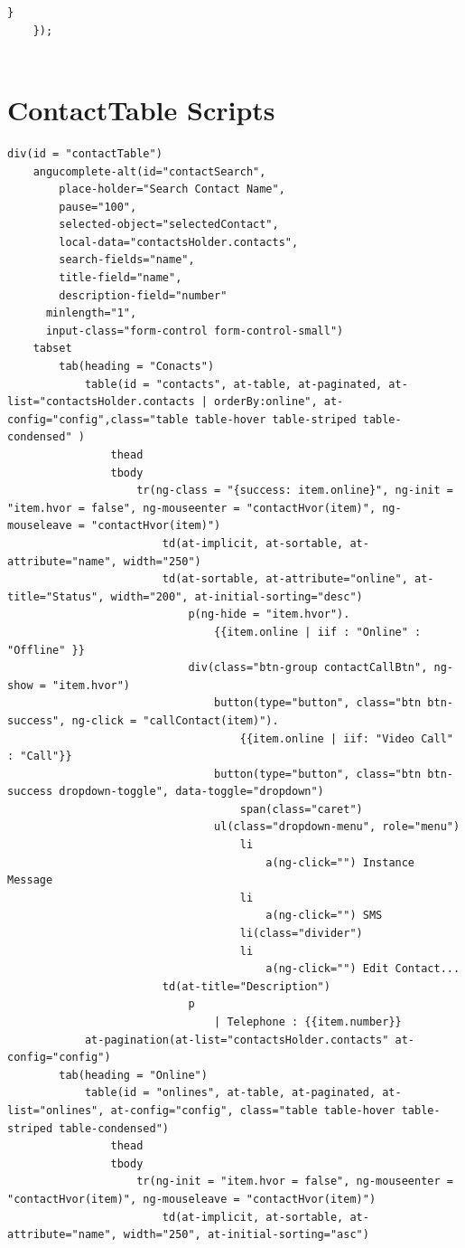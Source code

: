 \begin{appendices}
\begin{lstlisting}[caption={WebRTCService.js in application client},label={code:webrtc_service}]
		}
	});	
	
\end{lstlisting}

\section{ContactTable Scripts} 
\label{app:contact_table}

\begin{lstlisting}[caption={contactTable.jade in application client},label={code:contact_table}]
div(id = "contactTable")
	angucomplete-alt(id="contactSearch",
		place-holder="Search Contact Name",
		pause="100",
		selected-object="selectedContact",
		local-data="contactsHolder.contacts",
		search-fields="name",
		title-field="name",
		description-field="number"
	  minlength="1",
	  input-class="form-control form-control-small")
	tabset
		tab(heading = "Conacts")
			table(id = "contacts", at-table, at-paginated, at-list="contactsHolder.contacts | orderBy:online", at-config="config",class="table table-hover table-striped table-condensed" )
				thead
				tbody
					tr(ng-class = "{success: item.online}", ng-init = "item.hvor = false", ng-mouseenter = "contactHvor(item)", ng-mouseleave = "contactHvor(item)")
						td(at-implicit, at-sortable, at-attribute="name", width="250")
						td(at-sortable, at-attribute="online", at-title="Status", width="200", at-initial-sorting="desc")
							p(ng-hide = "item.hvor").
								{{item.online | iif : "Online" : "Offline" }}
							div(class="btn-group contactCallBtn", ng-show = "item.hvor")
								button(type="button", class="btn btn-success", ng-click = "callContact(item)").
									{{item.online | iif: "Video Call" : "Call"}}
								button(type="button", class="btn btn-success dropdown-toggle", data-toggle="dropdown")
									span(class="caret")
								ul(class="dropdown-menu", role="menu")
									li
										a(ng-click="") Instance Message
									li
										a(ng-click="") SMS
									li(class="divider")
									li
										a(ng-click="") Edit Contact...
						td(at-title="Description")
							p
								| Telephone : {{item.number}}
			at-pagination(at-list="contactsHolder.contacts" at-config="config")
		tab(heading = "Online")
			table(id = "onlines", at-table, at-paginated, at-list="onlines", at-config="config", class="table table-hover table-striped table-condensed")
				thead
				tbody
					tr(ng-init = "item.hvor = false", ng-mouseenter = "contactHvor(item)", ng-mouseleave = "contactHvor(item)")
						td(at-implicit, at-sortable, at-attribute="name", width="250", at-initial-sorting="asc")

\end{lstlisting}
\end{appendices}
